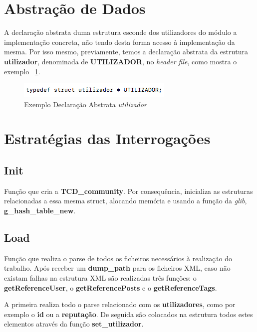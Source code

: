 \documentclass[a4paper]{article}
\begin{document}
\section{Abstração de Dados}
\label{sec:abstracao_de_dados}

A declaração abstrata duma estrutura esconde dos utilizadores do módulo a
implementação concreta, não tendo desta forma acesso à implementação
da mesma. Por isso mesmo, previamente, temos a declaração abstrata da 
estrutura \textbf{utilizador}, denominada de \textbf{UTILIZADOR}, no
\textit{header file}, como mostra o exemplo ~\ref{img:declaracao_utilizador}.

\begin{figure}[H]
\centering
\includegraphics[scale=0.70]{image_declaracao_utilizador}
\caption{Exemplo Declaração Abstrata \textit{utilizador}}
\label{img:declaracao_utilizador}
\end{figure}

\section{Estratégias das Interrogações}
\label{sec:estrategias}

\subsection{Init}

Função que cria a \textbf{TCD\_community}. Por consequência, inicializa
as estruturas relacionadas a essa mesma struct, alocando memória e usando
a função da \textit{glib}, \textbf{g\_hash\_table\_new}.

\subsection{Load}

Função que realiza o parse de todos os ficheiros necessários à realização
do trabalho. Após receber um \textbf{dump\_path} para os ficheiros XML,
caso não existam falhas na estrutura XML são realizadas três funções:
o \textbf{getReferenceUser}, o \textbf{getReferencePosts} e o
\textbf{getReferenceTags}.

A primeira realiza todo o parse relacionado com os \textbf{utilizadores}, 
como por exemplo o \textbf{id} ou a \textbf{reputação}. De seguida são 
colocados na estrutura todos estes elementos através da função
\textbf{set\_utilizador}.
\end{document}
